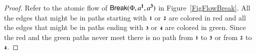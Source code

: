 \documentclass[a4paper]{amsart}
\theoremstyle{definition}
\theoremstyle{remark}
\newtheorem{remark}[theorem]{Remark}
\begin{document}
\begin{proof}
Refer to the atomic flow of $\Break(\Phi,a^\one,a^\three)$ in Figure~\ref{FigFlowBreak}.
All the edges that might be in paths starting with $\one$ or $\two$ are colored in red and all the edges that might be in paths ending with $\three$ or $\four$ are colored in green. Since the red and the green paths never meet there is no path from $\one$ to $\three$ or from $\two$ to $\four$.
\end{proof}
\end{document}
